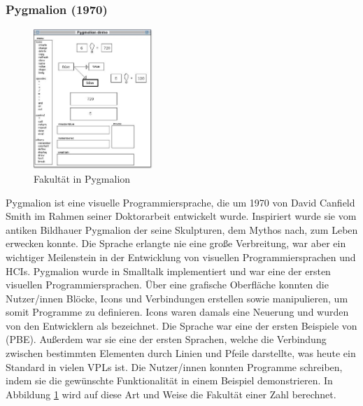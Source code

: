 \documentclass[ngerman]{article}
\begin{document}
\subsubsection{Pygmalion (1970)}
\begingroup
\setlength\intextsep{2pt}
\begin{minipage}{\linewidth}
\begin{figure}
  \centering
  \includegraphics[width=0.4\textwidth]{./graphics/pygmalion.jpg}
  \caption{Fakultät in Pygmalion \cite{smith1975pygmalion}}
  \label{fig:pygmalion_demo}
\end{figure}

Pygmalion ist eine visuelle Programmiersprache, die um 1970 von David Canfield Smith im Rahmen seiner Doktorarbeit entwickelt wurde. Inspiriert wurde sie vom antiken Bildhauer Pygmalion der seine Skulpturen, dem Mythos nach, zum Leben erwecken konnte.
Die Sprache erlangte nie eine große Verbreitung, war aber ein wichtiger Meilenstein in der Entwicklung von visuellen Programmiersprachen und HCIs.
Pygmalion wurde in Smalltalk implementiert und war eine der ersten visuellen Programmiersprachen. Über eine grafische Oberfläche konnten die Nutzer/innen Blöcke, Icons und Verbindungen erstellen sowie manipulieren, um somit Programme zu definieren.
  Icons waren damals eine Neuerung und wurden von den Entwicklern als  bezeichnet. 
  Die Sprache war eine der ersten Beispiele von  (PBE). Außerdem war sie eine der ersten Sprachen, welche die Verbindung zwischen bestimmten Elementen durch Linien und Pfeile darstellte, was heute ein Standard in vielen VPLs ist.
Die Nutzer/innen konnten Programme schreiben, indem sie die gewünschte Funktionalität in einem Beispiel demonstrieren. 
In Abbildung \ref{fig:pygmalion_demo} wird auf diese Art und Weise die Fakultät einer Zahl berechnet. 

\end{minipage}
\endgroup
\end{document}
